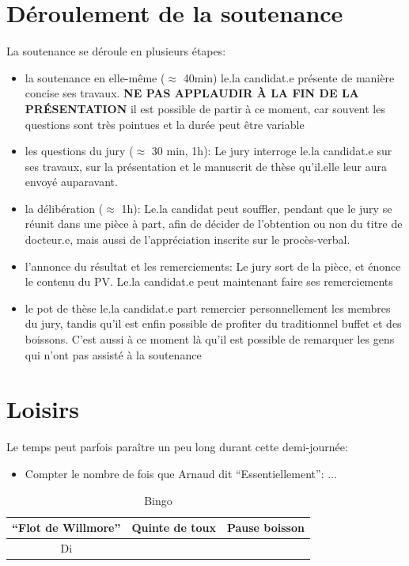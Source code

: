\documentclass[a4paper]{leaflet}
\begin{document}
\section*{Déroulement de la soutenance}
La soutenance se déroule en plusieurs étapes:
\begin{itemize}
\item la soutenance en elle-même ($\approx$ 40min)
  le.la candidat.e présente de manière concise ses travaux.
  \textbf{NE PAS APPLAUDIR À LA FIN DE LA PRÉSENTATION}
  il est possible de partir à ce moment, car souvent les questions sont très pointues et la durée peut être variable
\item les questions du jury ($\approx$ 30 min, 1h):
  Le jury interroge le.la candidat.e sur ses travaux, sur la présentation et le manuscrit de thèse qu'il.elle leur aura envoyé auparavant.
\item la délibération ($\approx$ 1h):
  Le.la candidat peut souffler, pendant que le jury se réunit dans une pièce à part, afin de décider de l'obtention ou non du titre de docteur.e, mais aussi de l'appréciation inscrite sur le procès-verbal.
\item l'annonce du résultat et les remerciements:
  Le jury sort de la pièce, et énonce le contenu du PV. Le.la candidat.e peut maintenant faire ses remerciements
\item le pot de thèse
  le.la candidat.e part remercier personnellement les membres du jury, tandis qu'il est enfin possible de profiter du traditionnel buffet et des boissons. C'est aussi à ce moment là qu'il est possible de remarquer les gens qui n'ont pas assisté à la soutenance
\end{itemize}
\section*{Loisirs}
Le temps peut parfois paraître un peu long durant cette demi-journée:

\begin{itemize}
\item Compter le nombre de fois que Arnaud dit ``Essentiellement'': $\dots$
\end{itemize}

\begin{table}[!h]
  \centering
  \begin{tabular}{*3{|c}}
    ``Flot de Willmore'' & Quinte de toux & Pause boisson  \\ \hline
    Di
  \end{tabular}
  \caption{Bingo}
\end{table}
\end{document}
